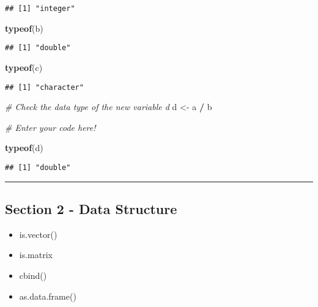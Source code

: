 \documentclass[
]{article}
\newenvironment{Shaded}{\begin{snugshade}}{\end{snugshade}}
\newcommand{\CommentTok}[1]{\textcolor[rgb]{0.56,0.35,0.01}{\textit{#1}}}
\newcommand{\FunctionTok}[1]{\textcolor[rgb]{0.13,0.29,0.53}{\textbf{#1}}}
\newcommand{\NormalTok}[1]{#1}
\newcommand{\OtherTok}[1]{\textcolor[rgb]{0.56,0.35,0.01}{#1}}
\newcommand{\SpecialCharTok}[1]{\textcolor[rgb]{0.81,0.36,0.00}{\textbf{#1}}}
\providecommand{\tightlist}{%
  \setlength{\itemsep}{0pt}\setlength{\parskip}{0pt}}
\begin{document}
\begin{verbatim}
## [1] "integer"
\end{verbatim}

\begin{Shaded}
\begin{Highlighting}[]
\FunctionTok{typeof}\NormalTok{(b)}
\end{Highlighting}
\end{Shaded}

\begin{verbatim}
## [1] "double"
\end{verbatim}

\begin{Shaded}
\begin{Highlighting}[]
\FunctionTok{typeof}\NormalTok{(c)}
\end{Highlighting}
\end{Shaded}

\begin{verbatim}
## [1] "character"
\end{verbatim}

\begin{Shaded}
\begin{Highlighting}[]
\CommentTok{\# Check the data type of the new variable \textquotesingle{}d\textquotesingle{}}
\NormalTok{d }\OtherTok{\textless{}{-}}\NormalTok{ a }\SpecialCharTok{/}\NormalTok{ b}

\CommentTok{\# Enter your code here!}

\FunctionTok{typeof}\NormalTok{(d)}
\end{Highlighting}
\end{Shaded}

\begin{verbatim}
## [1] "double"
\end{verbatim}

\begin{center}\rule{0.5\linewidth}{0.5pt}\end{center}

\subsection{Section 2 - Data
Structure}\label{section-2---data-structure}

\begin{itemize}
\tightlist
\item
  is.vector()
\item
  is.matrix
\item
  cbind()
\item
  as.data.frame()
\end{itemize}
\end{document}
